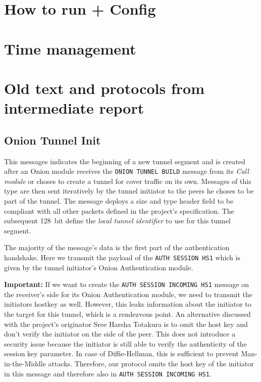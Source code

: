 \documentclass[paper=letter, fontsize=12pt]{article}
\begin{document}
\section{How to run + Config}

\section{Time management}


\section{Old text and protocols from intermediate report}

\subsection{Onion Tunnel Init}
This messages indicates the beginning of a new tunnel segment and is created after an Onion module receives the \texttt{ONION TUNNEL BUILD} message from its \emph{Call module} or choses to create a tunnel for cover traffic on its own. Messages of this type are then sent iteratively by the tunnel initiator to the peers he choses to be part of the tunnel. The message deploys a size and type header field to be compliant with all other packets defined in the project's specification. The subsequent 128~bit define the \emph{local tunnel identifier} to use for this tunnel segment. 

The majority of the message's data is the first part of the authentication handshake. Here we transmit the payload of the \texttt{AUTH SESSION HS1} which is given by the tunnel initiator's Onion Authentication module. 

\textbf{Important:} If we want to create the \texttt{AUTH SESSION INCOMING HS1} message on the receiver's side for its Onion Authentication module, we need to transmit the initiators hostkey as well. However, this leaks information about the initiator to the target for this tunnel, which is a rendezvous point. An alternative discussed with the project's originator Sree Harsha Totakura is to omit the host key and don't verify the initiator on the side of the peer. This does not introduce a security issue because the initiator is still able to verify the authenticity of the session key parameter. In case of Diffie-Hellman, this is sufficient to prevent Man-in-the-Middle attacks. Therefore, our protocol omits the host key of the initiator in this message and therefore also in \texttt{AUTH SESSION INCOMING HS1}. \\
\end{document}
